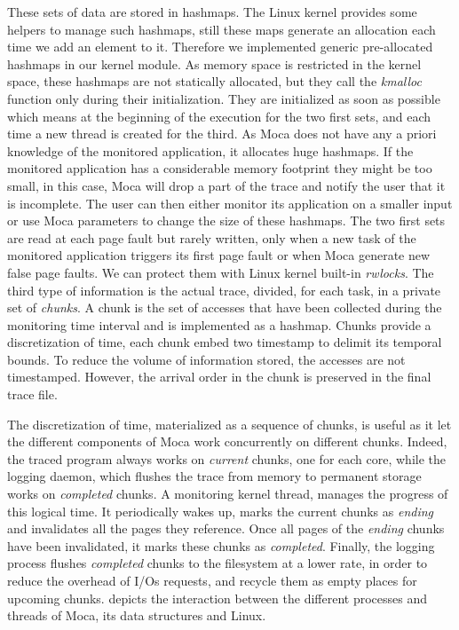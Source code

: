 These sets of data are stored in hashmaps.
The \gls{Linux} kernel provides some helpers to manage such hashmaps, still these maps generate an allocation each time we add an element to it.
Therefore we implemented generic pre-allocated hashmaps in our kernel module.
As memory space is restricted in the kernel space, these hashmaps are not statically allocated, but they call the \emph{kmalloc} function only during their initialization.
They are initialized as soon as possible which means at the beginning of the execution for the two first sets, and each time a new thread is created for the third.
As \gls{Moca} does not have any a priori knowledge of the monitored application, it allocates huge hashmaps.
If the monitored application has a considerable memory footprint they might be too small, in this case, \gls{Moca} will drop a part of the trace and notify the user that it is incomplete.
The user can then either monitor its application on a smaller input or  use \gls{Moca} parameters to change the size of these hashmaps.
The two first sets are read at each page fault but rarely written, only when a new task of the monitored application triggers its first page fault or when \gls{Moca} generate new false page faults.
We can protect them with Linux kernel built-in \emph{rwlocks}.
The third type of information is the actual trace, divided, for each task, in a private set of \emph{chunks}.
A chunk is the set of accesses that have been collected during the monitoring time interval and is implemented as a hashmap.
Chunks provide a discretization of time, each chunk embed two timestamp to delimit its temporal bounds.
To reduce the volume of information stored, the accesses are not timestamped.
However, the arrival order in the chunk is preserved in the final trace file.

The discretization of time, materialized as a sequence of chunks, is useful as it let the different components of \gls{Moca} work concurrently on different chunks.
Indeed, the traced program always works on \emph{current} chunks, one for each core, while the logging daemon, which flushes the trace from memory to permanent storage works on \emph{completed} chunks.
A monitoring kernel thread, manages the progress of this logical time.
It periodically wakes up, marks the current chunks as \emph{ending} and invalidates all the pages they reference.
Once all pages of the \emph{ending} chunks have been invalidated, it marks these chunks as \emph{completed}.
Finally, the logging process flushes \emph{completed} chunks to the filesystem at a lower rate, in order to reduce the overhead of I/Os requests, and recycle them as empty places for upcoming chunks.
  depicts the interaction between the different processes and threads of \gls{Moca}, its data structures and Linux.

